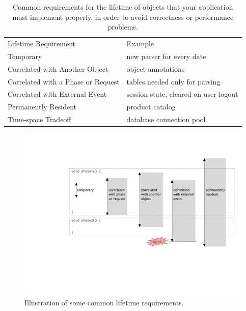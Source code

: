 \begin{table}
\centering
	\begin{tabular}{ll}
	\toprule
	   Lifetime Requirement & Example \\ \cmidrule(r){1-1} \cmidrule(l){2-2}
	  Temporary & new parser for every date
	\\
	Correlated with Another Object & object annotations
	\\
	Correlated with a Phase or Request & tables needed only for parsing
	\\
	Correlated with External Event & session state, cleared on user logout 
	\\
	 Permanently Resident & product catalog
	\\
	 Time-space Tradeoff & database connection pool
	  \\
	\bottomrule
	\end{tabular}
	\caption{Common requirements for the lifetime of objects that your
	application must implement properly, in order to avoid correctness or
	performance problems.}
	\label{tab:five-lifetimes}
\end{table}

\begin{figure}
\centering
\includegraphics[width=\textwidth]{part2/Figures/lifetime/requirements}
\caption{Illustration of some common lifetime requirements.}
\label{fig:five-lifetimes}
\end{figure}

